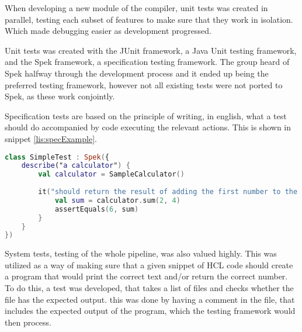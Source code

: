 When developing a new module of the compiler, unit tests was created in parallel, testing each subset of features to make sure that they work in isolation. Which made debugging easier as development progressed.


Unit tests was created with the JUnit\cite{JUnit} framework, a Java Unit testing framework, and the Spek\cite{SpekFramework} framework, a specification testing framework. 
The group heard of Spek halfway through the development process and it ended up being the preferred testing framework, however not all existing tests were not ported to Spek, as these work conjointly.

Specification tests are based on the principle of writing, in english, what a test should do accompanied by code executing the relevant actions.
This is shown in snippet \ref{lis:specExample}.


\begin{lstlisting}[language=Kotlin,label={lis:specExample},caption={An sample unit tests with spec}]
class SimpleTest : Spek({
	describe("a calculator") {
		val calculator = SampleCalculator()
		
		it("should return the result of adding the first number to the second number") {
			val sum = calculator.sum(2, 4)
			assertEquals(6, sum)
		}
	}
})
\end{lstlisting}

System tests, testing of the whole pipeline, was also valued highly.
This was utilized as a way of making sure that a given snippet of HCL code should create a program that would print the correct text and/or return the correct number.
To do this, a test was developed, that takes a list of files and checks whether the file has the expected output.
this was done by having a comment in the file, that includes the expected output of the program, which the testing framework would then process. 

